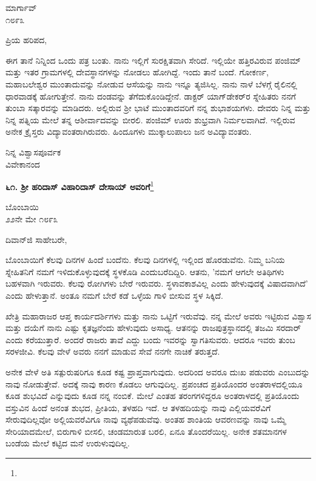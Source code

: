 \begin{flushright}
ಮಾರ್ಗಾವ್\\೧೮೯೩
\end{flushright}

\noindent
ಪ್ರಿಯ ಹರಿಪದ,

ಈಗ ತಾನೆ ನಿನ್ನಿಂದ ಒಂದು ಪತ್ರ ಬಂತು. ನಾನು ಇಲ್ಲಿಗೆ ಸುರಕ್ಷಿತವಾಗಿ ಸೇರಿದೆ. ಇಲ್ಲಿಯೇ ಹತ್ತಿರವಿರುವ ಪಂಜಿಮ್ ಮತ್ತು ಇತರ ಗ್ರಾಮಗಳಲ್ಲಿ ದೇವಸ್ಥಾನಗಳನ್ನು ನೋಡಲು ಹೋಗಿದ್ದೆ. ಇಂದು ತಾನೆ ಬಂದೆ. ಗೋಕರ್ಣ, ಮಹಾಬಲೇಶ್ವರ ಮುಂತಾದುವನ್ನು ನೋಡುವ ಆಸೆಯನ್ನು ನಾನು ಇನ್ನೂ ತ್ಯಜಿಸಿಲ್ಲ. ನಾನು ನಾಳೆ ಬೆಳಗ್ಗೆ ರೈಲಿನಲ್ಲಿ ಧಾರವಾಡಕ್ಕೆ ಹೋಗುತ್ತೇನೆ. ನಾನು ದಂಡವನ್ನು  ತೆಗೆದುಕೊಂಡಿದ್ದೇನೆ. ಡಾಕ್ಟರ್ ಯಾಗ್‌ಡೇಕರ್‌ರ ಸ್ನೇಹಿತರು ನನಗೆ ತುಂಬಾ ಸತ್ಕಾರವನ್ನು ಮಾಡಿದರು. ಅಲ್ಲಿರುವ ಶ‍್ರೀ ಭಾಟೆ ಮುಂತಾದವರಿಗೆ ನನ್ನ ಶುಭಾಶಯಗಳು. ದೇವರು ನಿನ್ನ ಮತ್ತು ನಿನ್ನ ಪತ್ನಿಯ ಮೇಲೆ ತನ್ನ ಆಶೀರ್ವಾದವನ್ನು ಬೀರಲಿ. ಪಂಜಿಮ್ ಊರು ಶುಭ್ರವಾಗಿ ನಿರ್ಮಲವಾಗಿದೆ. ಇಲ್ಲಿರುವ ಅನೇಕ ಕ್ರೈಸ್ತರು ವಿದ್ಯಾವಂತರಾಗಿರುವರು. ಹಿಂದೂಗಳು ಮುಕ್ಕಾಲುಪಾಲು ಜನ ಅವಿದ್ಯಾವಂತರು.

\vspace{-0.55cm}

{\flushright
ನಿನ್ನ ವಿಶ್ವಾಸಪೂರ್ವಕ\\ವಿವೇಕಾನಂದ\par}

\begin{center}
\textbf{೬೧. ಶ‍್ರೀ ಹರಿದಾಸ್ ವಿಹಾರಿದಾಸ್ ದೇಸಾಯ್ ಅವರಿಗೆ}\footnote{}
\end{center}

\vspace{-0.65cm}

\begin{flushright}
ಬೊಂಬಾಯಿ\\೨೨ನೇ ಮೇ ೧೮೯೩
\end{flushright}

\noindent
ದಿವಾನ್‌ಜಿ ಸಾಹೇಬರೇ,

ಬೊಂಬಾಯಿಗೆ ಕೆಲವು ದಿನಗಳ ಹಿಂದೆ ಬಂದೆನು. ಕೆಲವು ದಿನಗಳಲ್ಲಿ ಇಲ್ಲಿಂದ ಹೊರಡುವೆನು. ನಿಮ್ಮ ಬನಿಯ ಸ್ನೇಹಿತನಿಗೆ ನಮಗೆ ಇಳಿದುಕೊಳ್ಳುವುದಕ್ಕೆ ಸ್ಥಳಕೊಡಿ ಎಂದು\break ಬರೆದಿದ್ದಿರಿ. ಆತನು, 'ನಮಗೆ ಆಗಲೇ ಅತಿಥಿಗಳು ಬಹಳವಾಗಿ ಇರುವರು. ಕೆಲವು ರೋಗಿಗಳು ಬೇರೆ ಇರುವರು. ಸ್ಥಳಾವಕಾಶವಿಲ್ಲ ಎಂದು ಹೇಳುವುದಕ್ಕೆ ವಿಷಾದವಾಗಿದೆ' ಎಂದು ಹೇಳುತ್ತಾನೆ. ಅಂತೂ ನಮಗೆ ಬೇರೆ ಕಡೆ ಒಳ್ಳೆಯ ಗಾಳಿ ಬೀಸುವ ಸ್ಥಳ ಸಿಕ್ಕಿದೆ.

ಖೇತ್ರಿ ಮಹಾರಾಜರ ಆಪ್ತ ಕಾರ್ಯದರ್ಶಿಗಳು ಮತ್ತು ನಾನು ಒಟ್ಟಿಗೆ ಇರುವೆವು. ನನ್ನ ಮೇಲೆ ಅವರು ಇಟ್ಟಿರುವ ವಿಶ್ವಾಸ ಮತ್ತು ದಯೆಗೆ ನಾನು ಎಷ್ಟು ಕೃತಜ್ಞನೆಂದು ಹೇಳುವುದು ಅಸಾಧ್ಯ. ಆತನನ್ನು ರಾಜಪುತ್ರಸ್ಥಾನದಲ್ಲಿ ತಜಮಿ ಸರದಾರ್ ಎಂದು ಕರೆಯುತ್ತಾರೆ. ಅಂದರೆ ರಾಜರು ತಾವೆ ಎದ್ದು ಬಂದು ಇವರನ್ನು ಸ್ವಾಗತಿಸುವರು. ಆದರೂ ಇವರು ತುಂಬ ಸರಳಜೀವಿ. ಕೆಲವು ವೇಳೆ ಅವರು ನನಗೆ ಮಾಡುವ ಸೇವೆ ನನಗೇ ನಾಚಿಕೆ ತರುತ್ತದೆ.

ಅನೇಕ ವೇಳೆ ಅತಿ ಸತ್ಪುರುಷರಿಗೂ ಕೂಡ ಕಷ್ಟ ಪ್ರಾಪ್ತವಾಗುವುದು. ಅದರಿಂದ ಅವರೂ ದುಃಖ ಪಡುವರು ಎಂಬುದನ್ನು ನಾವು ನೋಡುತ್ತೇವೆ. ಅದಕ್ಕೆ ನಾವು ಕಾರಣ ಕೊಡಲು ಆಗುವುದಿಲ್ಲ. ಪ್ರಪಂಚದ ಪ್ರತಿಯೊಂದರ ಅಂತರಾಳದಲ್ಲಿಯೂ ಕೂಡ ಶುಭವಿದೆ ಎನ್ನುವುದು ಕೂಡ ನನ್ನ ನಂಬಿಕೆ. ಮೇಲೆ ಎಂತಹ ತರಂಗಗಳಿದ್ದರೂ ಅಂತರಾಳದಲ್ಲಿ ಪ್ರತಿಯೊಂದು ವಸ್ತುವಿನ ಹಿಂದೆ ಅನಂತ ಶುಭದ, ಪ್ರೀತಿಯ, ತಳಹದಿ ಇದೆ. ಆ ತಳಹದಿಯನ್ನು ನಾವು ಎಲ್ಲಿಯವರೆವಿಗೆ ಸೇರುವುದಿಲ್ಲವೋ ಅಲ್ಲಿಯವರೆವಿಗೂ ನಾವು ವ್ಯಥೆಪಡುವೆವು. ಅಂತಹ ಶಾಂತಿಯ ಆವರಣವನ್ನು ನಾವು ಒಮ್ಮೆ ಸೇರಿಯಾದಮೇಲೆ, ಬಿರುಗಾಳಿ ಬೀಸಲಿ, ಚಂಡಮಾರುತ ಬರಲಿ, ಏನೂ ತೊಂದರೆಯಿಲ್ಲ. ಅನೇಕ ಶತಮಾನಗಳ ಬಂಡೆಯ ಮೇಲೆ ಕಟ್ಟಿದ ಮನೆ ಉರುಳುವುದಿಲ್ಲ.

